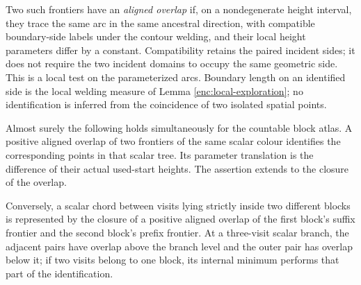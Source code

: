 Two such frontiers have an \emph{aligned overlap} if, on a nondegenerate
height interval, they trace the same arc in the same ancestral
direction, with compatible boundary-side labels under the contour
welding, and their local height parameters differ by a constant.
Compatibility retains the paired incident sides; it does not require
the two incident domains to occupy the same geometric side.
This is a local test on the parameterized arcs.  Boundary length on
an identified side is the local welding measure of Lemma
\ref{enc:local-exploration}; no identification is inferred from the
coincidence of two isolated spatial points.

\begin{lemma}
\label{ker:frontier-overlap}
Almost surely the following holds simultaneously for the countable
block atlas.  A positive aligned overlap of two frontiers of the same
scalar colour identifies the corresponding points in that scalar
tree.  Its parameter translation is the difference of their actual
used-start heights.  The assertion extends to the closure of the
overlap.

Conversely, a scalar chord between visits lying strictly inside two
different blocks is represented by the closure of a positive aligned
overlap of the first block's suffix frontier and the second block's
prefix frontier.  At a three-visit scalar branch, the adjacent pairs
have overlap above the branch level and the outer pair has overlap
below it; if two visits belong to one block, its internal minimum
performs that part of the identification.
\end{lemma}

